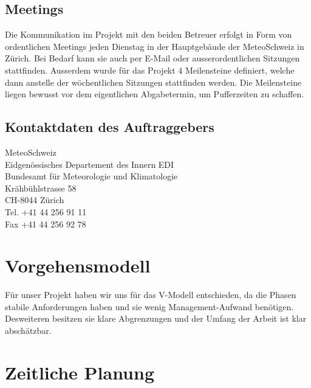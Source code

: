 \documentclass[a4paper,10pt]{article}
\begin{document}
\subsection{Meetings}
Die Kommunikation im Projekt mit den beiden Betreuer erfolgt in Form von ordentlichen Meetings jeden Dienstag in der Hauptgebäude der MeteoSchweiz in Zürich. Bei Bedarf kann sie auch per E-Mail oder ausserordentlichen Sitzungen stattfinden. Ausserdem wurde für das Projekt 4 Meilensteine definiert, welche dann anstelle der wöchentlichen Sitzungen stattfinden werden. Die Meilensteine liegen bewusst vor dem eigentlichen Abgabetermin, um Pufferzeiten zu schaffen.

\subsection{Kontaktdaten des Auftraggebers}
MeteoSchweiz\\
Eidgenössisches Departement des Innern EDI \\
Bundesamt für Meteorologie und Klimatologie\\
Krähbühlstrasse 58\\
CH-8044 Zürich\\
Tel.   +41 44 256 91 11 \\
Fax   +41 44 256 92 78\\

\section{Vorgehensmodell}
Für unser Projekt haben wir uns für das V-Modell entschieden, da die Phasen stabile Anforderungen haben und sie wenig Management-Aufwand benötigen. Desweiteren besitzen sie klare Abgrenzungen und der Umfang der Arbeit ist klar abschätzbar. 

\section{Zeitliche Planung}
\end{document}
